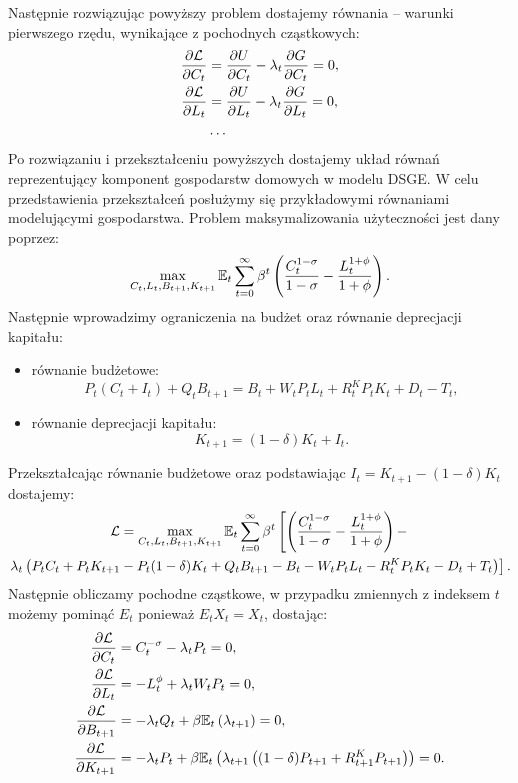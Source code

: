 Następnie rozwiązując powyższy problem dostajemy równania -- warunki pierwszego rzędu, wynikające z pochodnych cząstkowych:
\begin{align}
    \frac{\partial \mathcal{L}}{\partial C_t} &= \frac{\partial U}{\partial C_t} - \lambda_t \frac{\partial G}{\partial C_t} = 0,\\
    \frac{\partial \mathcal{L}}{\partial L_t} &= \frac{\partial U}{\partial L_t} - \lambda_t \frac{\partial G}{\partial L_t} = 0,\\
    &\notag\dots
\end{align}
Po rozwiązaniu i przekształceniu powyższych dostajemy układ równań reprezentujący komponent gospodarstw domowych w modelu DSGE. W celu przedstawienia przekształceń posłużymy się przykładowymi równaniami modelującymi gospodarstwa. Problem maksymalizowania użyteczności jest dany poprzez:
\begin{equation}
    \max_{C_t, L_t, B_{t+1}, K_{t+1}} \mathbb{E}_t\sum_{t=0}^{\infty}\beta^t\left(\frac{C_t^{1-\sigma}}{1-\sigma} - \frac{L_t^{1+\phi}}{1+\phi}\right).
\end{equation}
Następnie wprowadzimy ograniczenia na budżet oraz równanie deprecjacji kapitału:
\begin{itemize}
    \item równanie budżetowe:
        \begin{equation}
            P_t(C_t + I_t) + Q_t B_{t+1} = B_{t} + W_t P_t L_t + R^K_t P_t K_t + D_t - T_t,
        \end{equation}
    \item równanie deprecjacji kapitału:
        \begin{equation}
            K_{t+1} = (1-\delta)K_t + I_t.
        \end{equation}
\end{itemize}
Przekształcając równanie budżetowe oraz podstawiając $I_t = K_{t+1} - (1-\delta)K_t$ dostajemy:
\begin{multline}
    \mathcal{L} = \max_{C_t, L_t, B_{t+1}, K_{t+1}} \mathbb{E}_t\sum_{t=0}^{\infty}\beta^t\left[\left(\frac{C_t^{1-\sigma}}{1-\sigma} - \frac{L_t^{1+\phi}}{1+\phi}\right) - \right. \\ \left. \lambda_t\left(P_t C_t + P_t K_{t+1} - P_t (1-\delta) K_t + Q_t B_{t+1} - B_t - W_t P_t L_t - R^K_t P_t K_t - D_t + T_t\right)\right].
\end{multline}
Następnie  obliczamy pochodne cząstkowe, w przypadku zmiennych z indeksem $t$ możemy pominąć $E_t$ ponieważ $E_t X_t = X_t$,  dostając:
\begin{align}
    \frac{\partial \mathcal{L}}{\partial C_t} &= C_t^{-\sigma} - \lambda_t P_t = 0,\\
    \frac{\partial \mathcal{L}}{\partial L_t} &= -L_t^{\phi} + \lambda_t W_t P_t = 0,\\
    \label{eqn:euler_B}\frac{\partial \mathcal{L}}{\partial B_{t+1}} &= -\lambda_t Q_t + \beta \mathbb{E}_t \left( \lambda_{t+1}\right) = 0,\\
    \label{eqn:euler_K}\frac{\partial \mathcal{L}}{\partial K_{t+1}} &= -\lambda_t P_t + \beta \mathbb{E}_t \left( \lambda_{t+1} \left((1-\delta)P_{t+1} + R^K_{t+1} P_{t+1}\right)\right) = 0.\\
\end{align}
